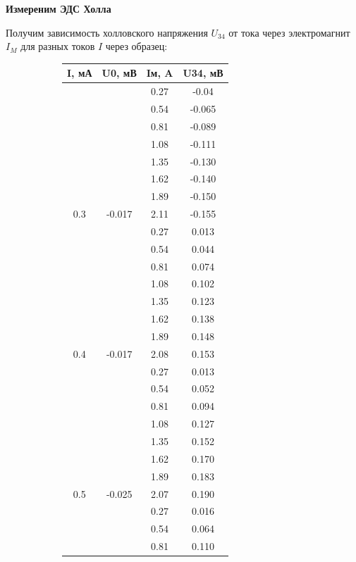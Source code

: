 \documentclass[11pt]{article}
\begin{document}
\textbf{Измереним ЭДС Холла}

Получим зависимость холловского напряжения \(U_{34}\) от тока через электромагнит \(I_{M}\) для разных токов \(I\) через образец:

\begin{figure}[H]
    \centering
    \begin{subfigure}{.5\textwidth}
    \centering
    \begin{tabular}{|c|c|c|c|}
        \hline
        I, мА & U0, мВ & Iм, A & U34, мВ \\\hline
        & & 0.27 & -0.04  \\
        & & 0.54 & -0.065 \\
        & & 0.81 & -0.089 \\
        & & 1.08 & -0.111 \\
        & & 1.35 & -0.130 \\
        & & 1.62 & -0.140 \\
        & & 1.89 & -0.150 \\
        \multirow{-8}{*}{0.3}         & \multirow{-8}{*}{-0.017}       & 2.11 & -0.155 \\\hline
        & & 0.27 & 0.013  \\
        & & 0.54 & 0.044  \\
        & & 0.81 & 0.074  \\
        & & 1.08 & 0.102  \\
        & & 1.35 & 0.123  \\
        & & 1.62 & 0.138  \\
        & & 1.89 & 0.148  \\
        \multirow{-8}{*}{0.4}         & \multirow{-8}{*}{-0.017}       & 2.08 & 0.153  \\\hline
        & & 0.27 & 0.013  \\
        & & 0.54 & 0.052  \\
        & & 0.81 & 0.094  \\
        & & 1.08 & 0.127  \\
        & & 1.35 & 0.152  \\
        & & 1.62 & 0.170  \\
        & & 1.89 & 0.183  \\
        \multirow{-8}{*}{0.5} & \multirow{-8}{*}{-0.025}       & 2.07 & 0.190  \\\hline
        & & 0.27 & 0.016  \\
        & & 0.54 & 0.064  \\
        & & 0.81 & 0.110  \\

\end{tabular}
\end{subfigure}
\end{figure}
\end{document}
